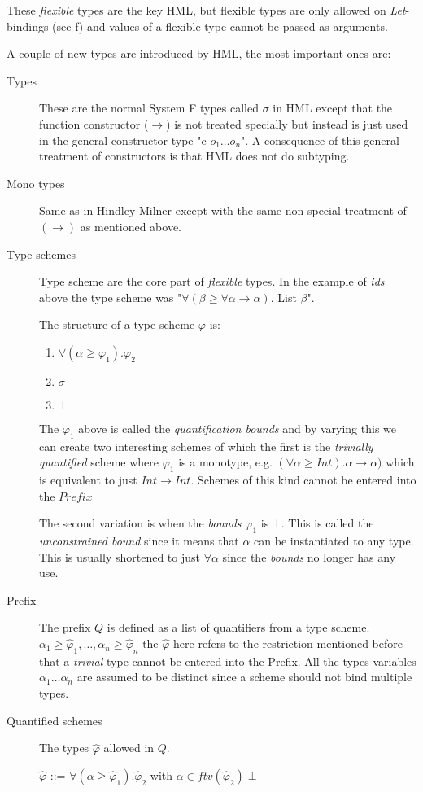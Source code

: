 \documentclass[12pt, a4paper, oneside]{article}
\begin{document}
These \textit{flexible} types are the key HML, but flexible types are only allowed on \textit{Let}-bindings (see f) and values of a flexible type cannot be passed as arguments.

A couple of new types are introduced by HML, the most important ones are:

\begin{description}
\item[Types] These are the normal System F types called $\sigma$ in HML except that the function constructor ($\rightarrow$) is not treated specially but instead is just used in the general constructor type "c $o_1 \ldots o_n$". A consequence of this general treatment of constructors is that HML does not do subtyping.
\item[Mono types] Same as in Hindley-Milner except with the same non-special treatment of $(\rightarrow)$ as mentioned above.
\item[Type schemes] Type scheme are the core part of \textit{flexible} types. In the example of \textit{ids} above the type scheme was "$\forall(\beta\geq \forall\alpha \rightarrow \alpha).$ List $\beta$".

The structure of a type scheme $\varphi$ is:
\begin{enumerate}
\item $\forall(\alpha\geq\varphi_1).\varphi_2$
\item $\sigma$
\item $\bot$
\end{enumerate}

The $\varphi_1$ above is called the \textit{quantification bounds} and by varying this we can create two interesting schemes of which the first is the \textit{trivially quantified} scheme where $\varphi_1$ is a monotype, e.g. $(\forall\alpha \geq Int). \alpha \rightarrow \alpha)$ which is equivalent to just $Int \rightarrow Int$. Schemes of this kind cannot be entered into the $\textit{Prefix}$

The second variation is when the \textit{bounds} $\varphi_1$ is $\bot$. This is called the \textit{unconstrained bound} since it means that $\alpha$ can be instantiated to any type. This is usually shortened to just $\forall\alpha$ since the \textit{bounds} no longer has any use.
\item[Prefix] The prefix $Q$ is defined as a list of quantifiers from a type scheme. $\alpha_1\geq\hat{\varphi}_1,\ldots,\alpha_n\geq\hat{\varphi}_n$
the $\hat{\varphi}$ here refers to the restriction mentioned before that a \textit{trivial} type cannot be entered into the Prefix. All the types variables $\alpha_1\ldots\alpha_n$ are assumed to be distinct since a scheme should not bind multiple types.
\item[Quantified schemes] The types $\hat{\varphi}$ allowed in $Q$.

$\hat{\varphi}$ ::= $\forall(\alpha\geq\hat{\varphi}_1).\hat{\varphi}_2$ with $\alpha\in ftv(\hat{\varphi}_2) | \bot$
\end{description}
\end{document}
